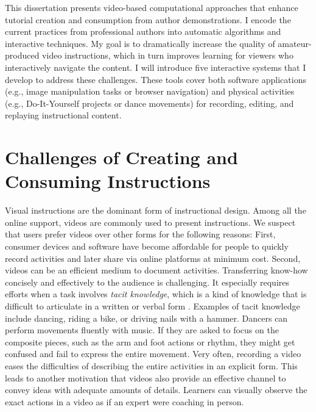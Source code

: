 This dissertation presents video-based computational approaches that enhance tutorial creation and consumption from author demonstrations.
I encode the current practices from professional authors into automatic algorithms and interactive techniques.
My goal is to dramatically increase the quality of amateur-produced video instructions, which in turn improves learning for viewers who interactively navigate the content.
%
I will introduce five interactive systems that I develop to address these challenges. These tools cover both software applications (e.g., image manipulation tasks or browser navigation) and physical activities (e.g., Do-It-Yourself projects or dance movements) for recording, editing, and replaying instructional content.


\section{Challenges of Creating and Consuming Instructions}

Visual instructions are the dominant form of instructional design.
%
Among all the online support, videos are commonly used to present instructions. We suspect that users prefer videos over other forms for the following reasons:
%
First, consumer devices and software have become affordable for people to quickly record activities and later share via online platforms at minimum cost.
%
Second, videos can be an efficient medium to document activities. Transferring know-how concisely and effectively to the audience is challenging. It especially requires efforts when a task involves \emph{tacit knowledge}, which is a kind of knowledge that is difficult to articulate in a written or verbal form \cite{polanyi1958personal, Klemmer:2006:BMF:1142405.1142429}. Examples of tacit knowledge include dancing, riding a bike, or driving nails with a hammer. Dancers can perform movements fluently with music. If they are asked to focus on the composite pieces, such as the arm and foot actions or rhythm, they might get confused and fail to express the entire movement. Very often, recording a video eases the difficulties of describing the entire activities in an explicit form.
%
This leads to another motivation that videos also provide an effective channel to convey ideas with adequate amounts of details. Learners can visually observe the exact actions in a video as if an expert were coaching in person.

